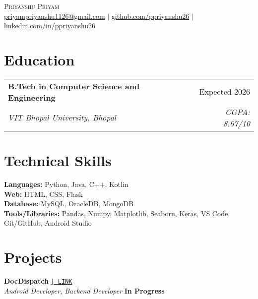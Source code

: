 \documentclass[a4paper,10pt]{article}
\makeatletter
\newcommand{\resumeSubheading}[4]{
  \vspace{1pt}\item
    \begin{tabular*}{\textwidth}{l@{\extracolsep{\fill}}r}
      \textbf{#1} & #2 \\
      \textit{\small#3} & \textit{\small #4} \\
    \end{tabular*}
}
\makeatother
\begin{document}
\begin{center}
  {\Huge \scshape Priyanshu Priyam} \\ \vspace{1pt}
  \href{mailto:priyampriyanshu1126@gmail.com}{priyampriyanshu1126@gmail.com} $|$
  \href{https://github.com/ppriyanshu26}{github.com/ppriyanshu26} $|$
  \href{https://linkedin.com/in/ppriyanshu26}{linkedin.com/in/ppriyanshu26}
\end{center}

\section{Education}

\vspace{-4pt}
\begin{flushleft}
  \hspace{1.5em}
  \resumeSubheading
    {B.Tech in Computer Science and Engineering}{Expected 2026}
    {VIT Bhopal University, Bhopal}{CGPA: 8.67/10}
\end{flushleft}

\section{Technical Skills}

\vspace{-4pt}
\hspace{1.5em}
\begin{flushleft}
  \textbf{Languages:} Python, Java, C++, Kotlin \\[6pt]
  \textbf{Web:} HTML, CSS, Flask \\[6pt]
  \textbf{Database:} MySQL, OracleDB, MongoDB \\[6pt]
  \textbf{Tools/Libraries:} Pandas, Numpy, Matplotlib, Seaborn, Keras, VS Code, Git/GitHub, Android Studio
\end{flushleft}



\section{Projects}

\noindent
\textbf{DocDispatch}
\href{https://github.com/yashpreeto7/DocDispatch}{\texttt{| LINK}} \\
\textit{Android Developer, Backend Developer} \hfill \textbf{In Progress} \\[-8pt]
\end{document}
